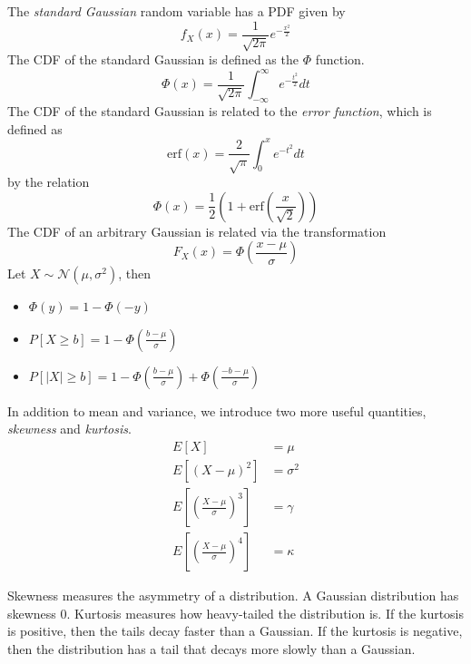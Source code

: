 The \emph{standard Gaussian} random variable has a
PDF given by
\begin{equation}
    f_X(x) = \frac{1}{\sqrt{2\pi}} e^{-\frac{x^2}{2}}
\end{equation}
The CDF of the standard Gaussian is defined
as the $\Phi$ function.
\begin{equation}
    \Phi(x) = \frac{1}{\sqrt{2\pi}}\int_{-\infty}^{\infty} e^{-\frac{t^2}{2}}dt
\end{equation}
The CDF of the standard Gaussian is related to the
\emph{error function}, which is defined as
\begin{equation}
    \text{erf}(x) = \frac{2}{\sqrt{\pi}} \int_{0}^{x} e^{-t^2} dt
\end{equation}
by the relation
\begin{equation}
    \Phi(x) = \frac{1}{2} \left(1 + \text{erf}\left(\frac{x}{\sqrt{2}}\right)\right)
\end{equation}
The CDF of an arbitrary Gaussian is related via
the transformation
\begin{equation}
    F_X(x) = \Phi\left(\frac{x - \mu}{\sigma}\right)
\end{equation}
Let $X \sim \mathcal{N}(\mu, \sigma^2)$, then
\begin{itemize}
    \item $\Phi(y) = 1 -\Phi(-y)$
    \item $P[X\geq b] = 1 - \Phi(\frac{b-\mu}{\sigma})$
    \item $P[|X| \geq b] = 1 - \Phi(\frac{b-\mu}{\sigma}) + \Phi(\frac{-b-\mu}{\sigma})$
\end{itemize}

In addition to mean and variance, we introduce
two more useful quantities, \emph{skewness} and
\emph{kurtosis}.
\begin{align}
    E\left[X\right]                                   & = \mu      \\
    E\left[(X - \mu)^2\right]                         & = \sigma^2 \\
    E\left[\left(\frac{X-\mu}{\sigma}\right)^3\right] & = \gamma   \\
    E\left[\left(\frac{X-\mu}{\sigma}\right)^4\right] & = \kappa
\end{align}

Skewness measures the asymmetry of a
distribution. A Gaussian distribution has
skewness 0. Kurtosis measures how heavy-tailed
the distribution is. If the kurtosis is
positive, then the tails decay faster than a
Gaussian. If the kurtosis is negative, then
the distribution has a tail that
decays more slowly than a Gaussian.


